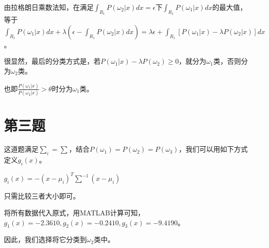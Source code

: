 \documentclass{ctexart}
\begin{document}
由拉格朗日乘数法知，在满足$\int_{R_1}P(\omega_2|x)dx=\epsilon$下$\int_{R_1}P(\omega_1|x)dx$的最大值，等于$\int_{R_1}P(\omega_1|x)dx+\lambda(\epsilon-\int_{R_1}P(\omega_2|x)dx)=\lambda \epsilon+\int_{R_1}[P(\omega_1|x)-\lambda P(\omega_2|x)]dx$。

很显然，最后的分类方式是，若$P(\omega_1|x)-\lambda P(\omega_2) \ge 0$，就分为$\omega_1$类，否则分为$\omega_2$类。

也即$\frac{P(\omega_1|x)}{P(\omega_2|x)}>\theta$时分为$\omega_1$类。
\section*{第三题}
这道题满足$\sum_i=\sum$，结合$P(\omega_1)=P(\omega_2)=P(\omega_3)$，我们可以用如下方式定义$g_i(x)$。

$g_i(x)=-(x-\mu_i)^T\sum^{-1}(x-\mu_i)$

只需比较三者大小即可。

将所有数据代入原式，用MATLAB计算可知，$g_1(x)=-2.3610,g_2(x)=-0.2410,g_3(x)=-9.4190$。

因此，我们选择将它分类到$\omega_2$类中。
\end{document}
